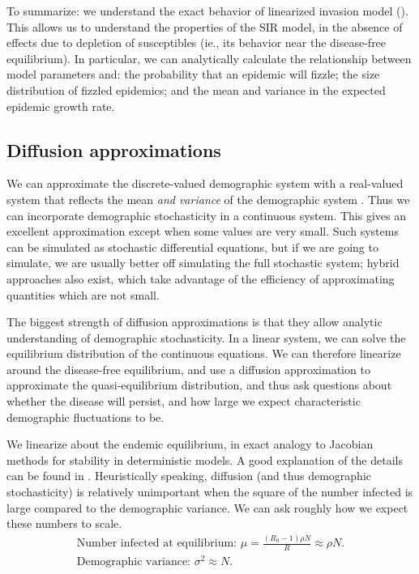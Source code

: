\documentclass{amsproc}
\theoremstyle{definition}
\theoremstyle{remark}
\numberwithin{equation}{section}
\begin{document}
To summarize: we understand the exact behavior of linearized invasion model (). 
This allows us to understand the properties of the SIR model, in the absence of effects due to depletion of susceptibles (ie., its behavior near the disease-free equilibrium).
In particular, we can analytically calculate the relationship between model parameters and: the probability that an epidemic will fizzle; the size distribution of fizzled epidemics; and the mean and variance in the expected epidemic growth rate.

\subsection{Diffusion approximations}

We can approximate the discrete-valued demographic system with a real-valued system that reflects the mean {\em and variance} of the demographic system . 
Thus we can incorporate demographic stochasticity in a continuous system. 
This gives an excellent approximation except when some values are very small. 
Such systems can be simulated as stochastic differential equations, but if we are going to simulate, we are usually better off simulating the full stochastic system; hybrid approaches also exist, which take advantage of the efficiency of approximating quantities which are not small.

The biggest strength of diffusion approximations is that they allow analytic understanding of demographic stochasticity.
In a linear system, we can solve the equilibrium distribution of the continuous equations.
We can therefore linearize around the disease-free equilibrium, and use a diffusion approximation to approximate the quasi-equilibrium distribution, and thus ask questions about whether the disease will persist, and how large we expect characteristic demographic fluctuations to be. 

We linearize about the endemic equilibrium, in exact analogy to Jacobian methods for stability in deterministic models.  
A good explanation of the details can be found in . 
Heuristically speaking,  diffusion (and thus demographic stochasticity) is relatively unimportant when the square of the number infected is large compared to the demographic variance.  We can ask roughly how we expect these numbers to scale.
\begin{equation}
	\begin{split}
		\mbox{Number infected at equilibrium:  }
		\mu = \frac{(R_0-1)\rho N}{R} \approx \rho N. \\
		\mbox{Demographic variance: } \sigma^2 \approx N. 
	\end{split}
\end{equation}
\end{document}
